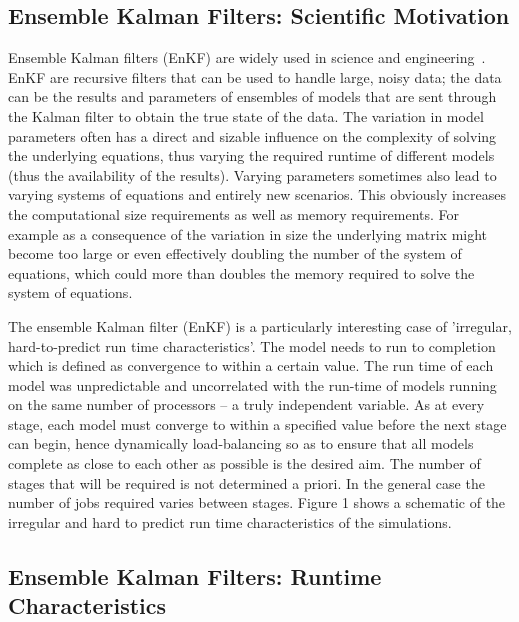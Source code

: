 \documentclass[conference,final]{IEEEtran}
\begin{document}
\subsection{Ensemble Kalman Filters: Scientific Motivation}

Ensemble Kalman filters (EnKF) are widely used in science and
engineering~\cite{DataAssim, KalmanPaper}. EnKF are recursive filters
that can be used to handle large, noisy data; the data can be the
results and parameters of ensembles of models that are sent through
the Kalman filter to obtain the true state of the data. The variation
in model parameters often has a direct and sizable influence on the
complexity of solving the underlying equations, thus varying the
required runtime of different models (thus the availability of the
results).  Varying parameters sometimes also lead to varying systems
of equations and entirely new scenarios. This obviously increases the
computational size requirements as well as memory requirements.  For
example as a consequence of the variation in size the underlying
matrix might become too large or even effectively doubling the number
of the system of equations, which could more than doubles the memory
required to solve the system of equations.

The ensemble Kalman filter (EnKF) is a particularly interesting case
of 'irregular, hard-to-predict run time characteristics'.  The model
needs to run to completion which is defined as convergence to within a
certain value.  The run time of each model was unpredictable and
uncorrelated with the run-time of models running on the same number of
processors -- a truly independent variable.  As at every stage, each
model must converge to within a specified value before the next stage
can begin, hence dynamically load-balancing so as to ensure that all
models complete as close to each other as possible is the desired aim.
The number of stages that will be required is not determined a
priori. In the general case the number of jobs required varies between
stages.  Figure 1 shows a schematic of the irregular and hard to
predict run time characteristics of the simulations.

\subsection{Ensemble Kalman Filters: Runtime Characteristics}
\end{document}
